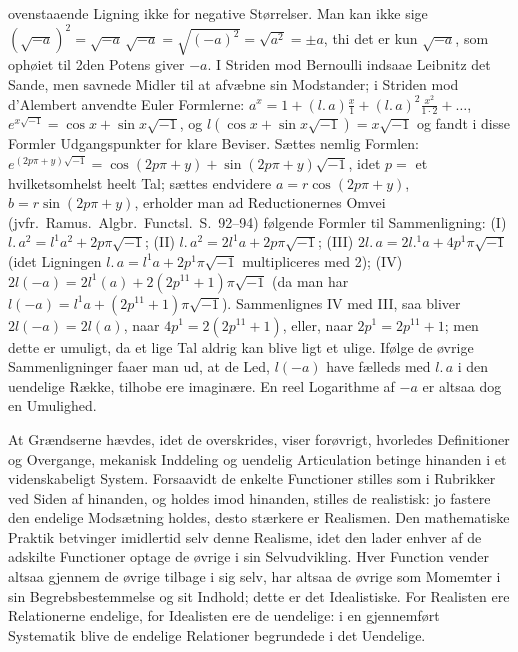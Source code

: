 \documentclass[12pt]{book}
\newcommand{\opage}[1]{\marginnote{\footnotesize\textit{[#1]}}}
\begin{document}
{ovenstaaende Ligning ikke for negative Størrelser. Man kan ikke sige
$(\sqrt{-a})^{2} = \sqrt{-a}\,\sqrt{-a} = \sqrt{(-a)^{2}} = \sqrt{a^{2}} = \pm a$,
thi det er kun $\sqrt{-a}$, som ophøiet til 2den Potens giver $-a$. I Striden mod
Bernoulli indsaae Leibnitz det Sande, men savnede Midler til at afvæbne sin
Modstander; i Striden mod d'Alembert anvendte Euler Formlerne:
$a^{x} = 1 + (l.\,a)\frac{x}{1} + (l.\,a)^{2}\frac{x^{2}}{1\cdot 2} + \dots$,
$e^{x\sqrt{-1}} = \cos x + \sin x\sqrt{-1}$, og
$l(\cos x + \sin x\sqrt{-1}) = x\sqrt{-1}$ og fandt i disse Formler Udgangspunkter
for klare Beviser. Sættes nemlig Formlen:
$e^{(2p\pi+y)\sqrt{-1}} = \cos(2p\pi+y) + \sin(2p\pi+y)\sqrt{-1}$, idet $p =$ et
hvilketsomhelst heelt Tal; sættes endvidere $a = r\cos(2p\pi+y)$,
$b = r\sin(2p\pi+y)$, erholder man ad Reductionernes Omvei (jvfr.\ Ramus.\ Algbr.\
Functsl.\ S.\ 92--94) følgende Formler til Sammenligning:
(I) $l.\,a^{2} = l^{1}a^{2} + 2p\pi\sqrt{-1}$;
(II) $l.\,a^{2} = 2l^{1}a + 2p\pi\sqrt{-1}$;
(III) $2l.\,a = 2l.^{1}a + 4p^{1}\pi\sqrt{-1}$ (idet Ligningen
$l.\,a = l^{1}a + 2p^{1}\pi\sqrt{-1}$ multipliceres med 2);
(IV) $2l(-a) = 2l^{1}(a) + 2(2p^{11}+1)\pi\sqrt{-1}$ (da man har
$l(-a) = l^{1}a + (2p^{11}+1)\pi\sqrt{-1}$). Sammenlignes IV med III, saa bliver
$2l(-a) = 2l(a)$, naar $4p^{1} = 2(2p^{11}+1)$, eller, naar $2p^{1} = 2p^{11}+1$;
men dette er umuligt, da et lige Tal aldrig kan blive ligt et ulige. Ifølge de
øvrige Sammenligninger faaer man ud, at de Led, $l(-a)$ have fælleds med $l.\,a$
i den uendelige Række, tilhobe ere imaginære. En reel Logarithme af $-a$ er
altsaa dog en Umulighed.}

\opage{40} At Grændserne hævdes, idet de overskrides, viser forøvrigt, hvorledes
Definitioner og Overgange, mekanisk Inddeling og uendelig Articulation betinge
hinanden i et videnskabeligt System. Forsaavidt de enkelte Functioner stilles som
i Rubrikker ved Siden af hinanden, og holdes imod hinanden, stilles de
realistisk: jo fastere den endelige Modsætning holdes, desto
\opage{41} stærkere er Realismen. Den mathematiske Praktik betvinger imidlertid selv denne
Realisme, idet den lader enhver af de adskilte Functioner optage de øvrige i sin
Selvudvikling. Hver Function vender altsaa gjennem de øvrige tilbage i sig selv,
har altsaa de øvrige som Momemter i sin Begrebsbestemmelse og sit Indhold; dette
er det Idealistiske. For Realisten ere Relationerne endelige, for Idealisten ere
de uendelige: i en gjennemført Systematik blive de endelige Relationer
begrundede i det Uendelige.
\end{document}
